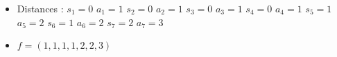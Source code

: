 \begin{example}[$a > b : a = 7, b = 3,
    \mathcal{R}_{a,b} \to \mathcal{PF'}_{a,b}$]
\begin{center}
\begin{tikzpicture}[scale=1]
        \end{tikzpicture}
    \end{center}
    \begin{itemize}
        \item Distances : 
            \subitem $s_1 = 0$
                \hspace{2cm} $a_1 = 1$
            \subitem $s_2 = 0$
                \hspace{2cm} $a_2 = 1$
            \subitem $s_3 = 0$
                \hspace{2cm} $a_3 = 1$
            \subitem $s_4 = 0$
                \hspace{2cm} $a_4 = 1$
            \subitem $s_5 = 1$
                \hspace{2cm} $a_5 = 2$
            \subitem $s_6 = 1$
                \hspace{2cm} $a_6 = 2$
            \subitem $s_7 = 2$
                \hspace{2cm} $a_7 = 3$
        \item $f = (1, 1, 1, 1, 2, 2, 3)$
    \end{itemize}
    
\end{example}

